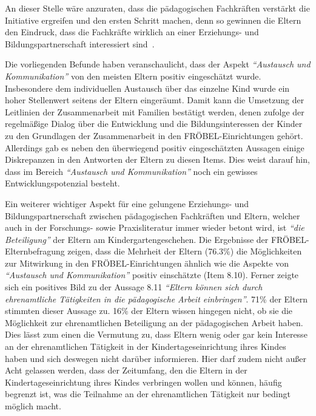 \documentclass[12pt,a4paper]{article}
\begin{document}
An dieser Stelle wäre anzuraten, dass die pädagogischen Fachkräften verstärkt die Initiative ergreifen und den ersten Schritt machen, denn so gewinnen die Eltern den Eindruck, dass die Fachkräfte wirklich an einer Erziehungs- und Bildungspartnerschaft interessiert sind~\parencite[S.~8, 11]{Froelich}.
 
	Die vorliegenden Befunde haben veranschaulicht, dass der Aspekt \textit{"`Austausch und Kommunikation"'} von den meisten Eltern positiv eingeschätzt wurde. Insbesondere dem individuellen Austausch über das einzelne Kind wurde ein hoher Stellenwert seitens der Eltern eingeräumt. Damit kann die Umsetzung der Leitlinien der Zusammenarbeit mit Familien bestätigt werden, denen zufolge der regelmäßige Dialog über die Entwicklung und die Bildungsinteressen der Kinder zu den Grundlagen der Zusammenarbeit in den FRÖBEL-Einrichtungen gehört. Allerdings gab es neben den überwiegend positiv eingeschätzten Aussagen einige Diskrepanzen in den Antworten der Eltern zu diesen Items. Dies weist darauf hin, dass im Bereich \textit{"`Austausch und Kommunikation"'} noch ein gewisses Entwicklungspotenzial besteht.
	
	Ein weiterer wichtiger Aspekt für eine gelungene Erziehungs- und Bildungspartnerschaft zwischen pädagogischen Fachkräften und Eltern, welcher auch in der Forschungs- sowie Praxisliteratur immer wieder betont wird, ist  \textit{"`die Beteiligung"'} der Eltern am Kindergartengeschehen. Die Ergebnisse der FRÖBEL-Elternbefragung zeigen, dass die Mehrheit der Eltern (76.3\%) die Möglichkeiten zur Mitwirkung in den FRÖBEL-Einrichtungen ähnlich wie die Aspekte von \textit{"`Austausch und Kommunikation"'} positiv einschätzte (Item 8.10). Ferner zeigte sich ein positives Bild zu der Aussage 8.11 \textit{"`Eltern können sich durch ehrenamtliche Tätigkeiten in die pädagogische Arbeit einbringen"'}. 71\% der Eltern stimmten dieser Aussage zu. 16\% der Eltern wissen hingegen nicht, ob sie die Möglichkeit zur ehrenamtlichen Beteiligung an der pädagogischen Arbeit haben. Dies lässt zum einen die Vermutung zu, dass Eltern wenig oder gar kein Interesse an der ehrenamtlichen Tätigkeit in der Kindertageseinrichtung ihres Kindes haben und sich deswegen nicht darüber informieren. Hier darf zudem nicht außer Acht gelassen werden, dass der Zeitumfang, den die Eltern in der Kindertageseinrichtung ihres Kindes verbringen wollen und können, häufig begrenzt ist, was die Teilnahme an der ehrenamtlichen Tätigkeit nur bedingt möglich macht. 
	
\end{document}
